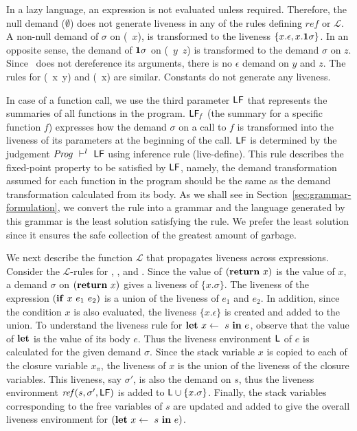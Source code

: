 \documentclass[9pt,nonatbib]{sigplanconf}
\begin{document}
In  a   lazy  language,   an  expression   is  not   evaluated  unless
required. Therefore,  the null  demand ($\emptyset$) does  not generate
liveness in any of the rules defining $\mathit{ref}$ or $\mathcal{L}$.
A non-null  demand of  $\sigma$ on (\CDR~$x$),  is transformed  to the
liveness $\{x.\epsilon,  x.\mathbf{1}\sigma\}$.  In an opposite  sense, the
demand  of  $\mathbf{1}\sigma$ on  (\CONS~$y$~$z$)  is  transformed to  the
demand  $\sigma$  on  $z$.   Since \CONS\  does  not  dereference  its
arguments, there  is no $\epsilon$ demand  on $y$ and $z$.   The rules
for (\PRIM~x~y) and (\NULLQ~x) are  similar. Constants do not generate
any liveness.



In case of a  function call, we  use the third  parameter $\mathsf{LF}$
that  represents  the  summaries  of all  functions  in  the  program.
$\mathsf{LF}_{\mathit  f}$  (the summary for a  specific
function $f$) expresses  how the demand $\sigma$ on a  call to $f$ is
transformed into  the liveness of  its parameters at the  beginning of
the  call.  $\mathsf{LF}$  is determined  by the  judgement $\mathit{Prog}
\ \vdash^l\   \mathsf{LF}$ using  inference rule  ({\sc live-define}).   This rule
describes  the  fixed-point property  to  be  satisfied by  $\mathsf{LF}$,
namely, the  demand transformation  assumed for  each function  in the
program should  be the  same as  the demand  transformation calculated
from      its      body.       As       we      shall      see      in
Section~\ref{sec:grammar-formulation},  we  convert  the rule  into  a
grammar and  the language generated  by this grammar is  the least
solution satisfying  the rule. We  prefer the least solution  since it
ensures the safe collection of the greatest amount of garbage.

We next  describe the function $\mathcal{L}$  that propagates liveness
across  expressions.   Consider  the $\mathcal{L}$-rules  for  {\LET},
{\SIF}, and {\SRETURN}.  Since the value of $(\mbox{$\mathbf{ return}$}~x)$ is the
value  of  $x$,  a  demand $\sigma$  on  $(\mbox{$\mathbf{ return}$}~x)$  gives  a
liveness   of  $\{x.\sigma\}$.    The  liveness   of  the   expression
$(\mbox{$\mathbf{ if}$}~x~e_1~e_2)$  is  a union  of  the  liveness of  $e_1$  and
$e_2$. In  addition, since  the condition $x$  is also  evaluated, the
liveness $\{x.\epsilon\}$ is created and  added to the union.  
To  understand  the  liveness rule  for  $\mbox{$\mathbf{ let}$}~x  \leftarrow~s~\mbox{$\mathbf{ in}$}~e$,
observe that the value  of $\mbox{$\mathbf{ let}$}$ is the value of  its body $e$.  Thus
the  liveness environment  $\mathsf{L}$ of  $e$ is  calculated for  the given
demand $\sigma$. Since the stack variable $x$ is copied to each of the
closure variable  $x_{\pi}$, the liveness of  $x$ is the union  of the
liveness of the  closure variables.  This liveness,  say $\sigma'$, is
also  the  demand  on  $s$, thus the  liveness  environment
$\mathit{ref}(s,   \sigma',   \mathsf{LF})$   is  added   to   $\mathsf{L}   \cup
\{x.\sigma\}$. Finally, the stack variables corresponding to the free
variables of $s$ are updated and added 
  to  give the  overall liveness environment  for $(\mbox{$\mathbf{ let}$}~x
\leftarrow~s~\mbox{$\mathbf{ in}$}~e)$.
\end{document}
